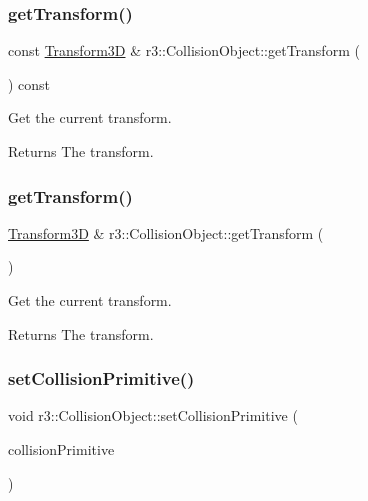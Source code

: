 \subsubsection{\texorpdfstring{get\+Transform()}{getTransform()}\hspace{0.1cm}{\footnotesize\ttfamily [1/2]}}
{\footnotesize\ttfamily const \mbox{\hyperlink{classr3_1_1_transform3_d}{Transform3D}} \& r3\+::\+Collision\+Object\+::get\+Transform (\begin{DoxyParamCaption}{ }\end{DoxyParamCaption}) const}



Get the current transform. 

\begin{DoxyReturn}{Returns}
The transform. 
\end{DoxyReturn}
\mbox{\label{classr3_1_1_collision_object_acc41118b9a571e5aa918644aaeda6bfa}} 
\subsubsection{\texorpdfstring{get\+Transform()}{getTransform()}\hspace{0.1cm}{\footnotesize\ttfamily [2/2]}}
{\footnotesize\ttfamily \mbox{\hyperlink{classr3_1_1_transform3_d}{Transform3D}} \& r3\+::\+Collision\+Object\+::get\+Transform (\begin{DoxyParamCaption}{ }\end{DoxyParamCaption})}



Get the current transform. 

\begin{DoxyReturn}{Returns}
The transform. 
\end{DoxyReturn}
\mbox{\label{classr3_1_1_collision_object_afaf76460298998bcbe405c0b2e6de6a6}} 
\subsubsection{\texorpdfstring{set\+Collision\+Primitive()}{setCollisionPrimitive()}}
{\footnotesize\ttfamily void r3\+::\+Collision\+Object\+::set\+Collision\+Primitive (\begin{DoxyParamCaption}\item[{\mbox{\hyperlink{classr3_1_1_collision_primitive}{Collision\+Primitive}} $\ast$}]{collision\+Primitive }\end{DoxyParamCaption})}



